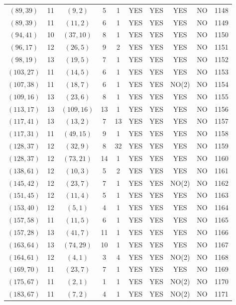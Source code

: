 \begin{longtable}{|c|c|c|c|c|c|c|c|c|c|}
$(89, 39)$ & 11 & $(9, 2)$ & 5 & 1 & YES & YES & YES & NO & 1148\\
$(89, 39)$ & 11 & $(11, 2)$ & 6 & 1 & YES & YES & YES & NO & 1149\\
$(94, 41)$ & 10 & $(37, 10)$ & 8 & 1 & YES & YES & YES & NO & 1150\\
$(96, 17)$ & 12 & $(26, 5)$ & 9 & 2 & YES & YES & YES & NO & 1151\\
$(98, 19)$ & 13 & $(19, 5)$ & 7 & 1 & YES & YES & YES & NO & 1152\\
$(103, 27)$ & 11 & $(14, 5)$ & 6 & 1 & YES & YES & YES & NO & 1153\\
$(107, 38)$ & 11 & $(18, 7)$ & 6 & 1 & YES & YES & NO(2) & NO & 1154\\
$(109, 16)$ & 13 & $(23, 6)$ & 8 & 1 & YES & YES & YES & NO & 1155\\
$(113, 17)$ & 13 & $(109, 16)$ & 13 & 1 & YES & YES & YES & NO & 1156\\
$(117, 41)$ & 13 & $(13, 2)$ & 7 & 13 & YES & YES & YES & NO & 1157\\
$(117, 31)$ & 11 & $(49, 15)$ & 9 & 1 & YES & YES & YES & NO & 1158\\
$(128, 37)$ & 12 & $(32, 9)$ & 8 & 32 & YES & YES & YES & NO & 1159\\
$(128, 37)$ & 12 & $(73, 21)$ & 14 & 1 & YES & YES & YES & NO & 1160\\
$(138, 61)$ & 12 & $(10, 3)$ & 5 & 2 & YES & YES & YES & NO & 1161\\
$(145, 42)$ & 12 & $(23, 7)$ & 7 & 1 & YES & YES & NO(2) & NO & 1162\\
$(151, 45)$ & 12 & $(11, 4)$ & 5 & 1 & YES & YES & YES & NO & 1163\\
$(153, 40)$ & 12 & $(5, 1)$ & 4 & 1 & YES & YES & YES & NO & 1164\\
$(157, 58)$ & 11 & $(11, 5)$ & 6 & 1 & YES & YES & YES & NO & 1165\\
$(157, 28)$ & 13 & $(41, 7)$ & 11 & 1 & YES & YES & YES & NO & 1166\\
$(163, 64)$ & 13 & $(74, 29)$ & 10 & 1 & YES & YES & YES & NO & 1167\\
$(164, 61)$ & 12 & $(4, 1)$ & 3 & 4 & YES & YES & NO(2) & NO & 1168\\
$(169, 70)$ & 11 & $(23, 7)$ & 7 & 1 & YES & YES & YES & NO & 1169\\
$(175, 67)$ & 11 & $(2, 1)$ & 1 & 1 & YES & YES & NO(2) & NO & 1170\\
$(183, 67)$ & 11 & $(7, 2)$ & 4 & 1 & YES & YES & NO(2) & NO & 1171\\

\end{longtable}

